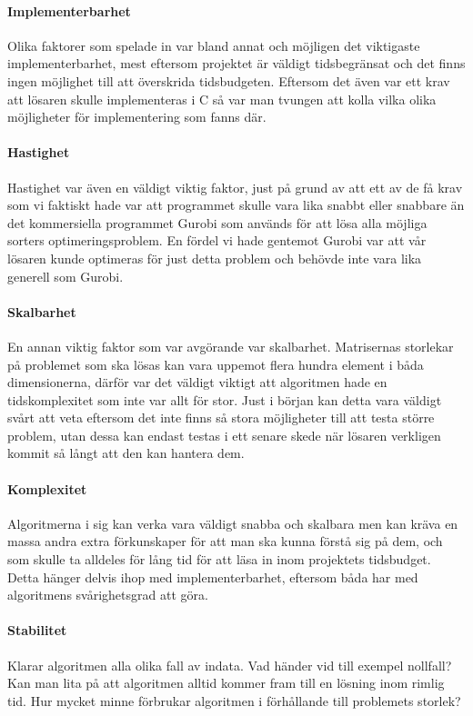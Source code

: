 \paragraph{Implementerbarhet}
Olika faktorer som spelade in var bland annat och möjligen det viktigaste implementerbarhet, mest eftersom projektet är väldigt tidsbegränsat och det finns ingen möjlighet till att överskrida tidsbudgeten. Eftersom det även var ett krav att lösaren skulle implementeras i C så var man tvungen att kolla vilka olika möjligheter för implementering som fanns där.

\paragraph{Hastighet}
Hastighet var även en väldigt viktig faktor, just på grund av att ett av de få krav som vi faktiskt hade var att programmet skulle vara lika snabbt eller snabbare än det kommersiella programmet Gurobi som används för att lösa alla möjliga sorters optimeringsproblem. En fördel vi hade gentemot Gurobi var att vår lösaren kunde optimeras för just detta problem och behövde inte vara lika generell som Gurobi.

\paragraph{Skalbarhet}
En annan viktig faktor som var avgörande var skalbarhet. Matrisernas storlekar på problemet som ska lösas kan vara uppemot flera hundra element i båda dimensionerna, därför var det väldigt viktigt att algoritmen hade en tidskomplexitet som inte var allt för stor. Just i början kan detta vara väldigt svårt att veta eftersom det inte finns så stora möjligheter till att testa större problem, utan dessa kan endast testas i ett senare skede när lösaren verkligen kommit så långt att den kan hantera dem.

\paragraph{Komplexitet}
Algoritmerna i sig kan verka vara väldigt snabba och skalbara men kan kräva en massa andra extra förkunskaper för att man ska kunna förstå sig på dem, och som skulle ta alldeles för lång tid för att läsa in inom projektets tidsbudget. Detta hänger delvis ihop med implementerbarhet, eftersom båda har med algoritmens svårighetsgrad att göra.

\paragraph{Stabilitet}
Klarar algoritmen alla olika fall av indata. Vad händer vid till exempel nollfall? Kan man lita på att algoritmen alltid kommer fram till en lösning inom rimlig tid. Hur mycket minne förbrukar algoritmen i förhållande till problemets storlek? %

